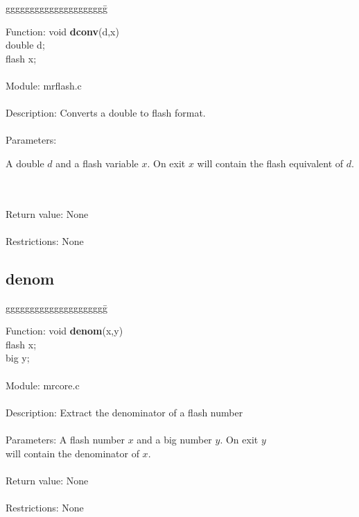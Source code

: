 \begin{tabbing}
ggggggggggggggggggggg\= \kill

      Function:      \>void {\bf dconv}(d,x)  \\
                     \>double d;   \\
                     \>flash x;    \\
      \ \\
      Module:        \>mrflash.c  \\
      \ \\
      Description:   \>Converts a double to flash format. \\
      \ \\
      Parameters:    \>
                     \parbox[t]{3 in}
                     {A double $d$ and a flash variable $x$. On exit $x$ will
                     contain the flash equivalent of $d$. } \\
      \ \\
      Return value:  \>None   \\
      \ \\                    
      Restrictions:  \>None   \\
\end{tabbing}

\subsection{denom}

\begin{tabbing}
ggggggggggggggggggggg\= \kill

      Function:      \>void {\bf denom}(x,y) \\
                     \>flash x;  \\
                     \>big y;    \\
      \ \\
      Module:        \>mrcore.c \\
      \ \\
      Description:   \>Extract the denominator of a flash number \\
      \ \\
      Parameters:    \>A flash number $x$ and a big number $y$. On exit $y$ \\
                     \>will contain the denominator of $x$.   \\
      \ \\
      Return value:  \>None \\
      \ \\
      Restrictions:  \>None    \\
\end{tabbing}
\pagebreak
